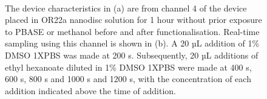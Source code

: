 \documentclass[
  a4paper,
]{scrbook}
\begin{document}
\begin{figure}
\begin{minipage}[t]{0.45\linewidth}
{{}

}

\end{minipage}%
%
\begin{minipage}[t]{0.03\linewidth}

{\centering 

~

}

\end{minipage}%
%
\begin{minipage}[t]{0.03\linewidth}

{\centering 


}

\end{minipage}%
%
\begin{minipage}[t]{0.45\linewidth}

{\centering 


}

\end{minipage}%

\caption{\label{fig-OR22a-variability-TX-comparison}The device
characteristics in (a) are from channel 4 of the device placed in OR22a
nanodisc solution for 1 hour without prior exposure to PBASE or methanol
before and after functionalisation. Real-time sampling using this
channel is shown in (b). A 20 µL addition of 1\% DMSO 1XPBS was made at
200 s. Subsequently, 20 µL additions of ethyl hexanoate diluted in 1\%
DMSO 1XPBS were made at 400 s, 600 s, 800 s and 1000 s and 1200 s, with
the concentration of each addition indicated above the time of
addition.}

\end{figure}
\end{document}
